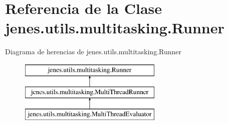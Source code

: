 \hypertarget{classjenes_1_1utils_1_1multitasking_1_1_runner}{\section{Referencia de la Clase jenes.\-utils.\-multitasking.\-Runner}
\label{classjenes_1_1utils_1_1multitasking_1_1_runner}
}
Diagrama de herencias de jenes.\-utils.\-multitasking.\-Runner\begin{figure}[H]
\begin{center}
\leavevmode
\includegraphics[height=3.000000cm]{classjenes_1_1utils_1_1multitasking_1_1_runner}
\end{center}
\end{figure}
